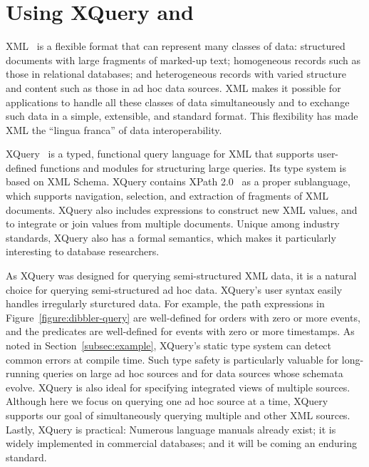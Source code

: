 \section{Using XQuery and \Galax{}}
\label{section:galax}

XML~\cite{xml} is a flexible format that can represent many classes of
data: structured documents with large fragments of marked-up text;
homogeneous records such as those in relational databases; and
heterogeneous records with varied structure and content such as those
in ad hoc data sources.  XML makes it possible for applications to
handle all these classes of data simultaneously and to exchange such
data in a simple, extensible, and standard format.  This flexibility
has made XML the ``lingua franca'' of data
interoperability. 

XQuery~\cite{xquery} is a typed, functional query language for XML
that supports user-defined functions and modules for structuring large
queries.  Its type system is based on XML Schema.  XQuery contains
XPath 2.0~\cite{xpath} as a proper sublanguage, which supports
navigation, selection, and extraction of fragments of XML documents.
XQuery also includes expressions to construct new XML values, and to
integrate or join values from multiple documents.  Unique among
industry standards, XQuery also has a formal semantics, which makes it
particularly interesting to database researchers. 

As XQuery was designed for querying semi-structured XML data, it is a
natural choice for querying semi-structured ad hoc data.  XQuery's
user syntax easily handles irregularly sturctured data.  For example,
the path expressions in Figure~\ref{figure:dibbler-query} are
well-defined for orders with zero or more events, and the predicates
are well-defined for events with zero or more timestamps.  As noted in
Section~\ref{subsec:example}, XQuery's static type system can detect
common errors at compile time.  Such type safety is particularly
valuable for long-running queries on large ad hoc sources and for data
sources whose schemata evolve.  XQuery is also ideal for specifying
integrated views of multiple sources.  Although here we focus on
querying one ad hoc source at a time, XQuery supports our goal of
simultaneously querying multiple \pads{} and other XML
sources. Lastly, XQuery is practical: Numerous language manuals
already exist; it is widely implemented in commercial databases; and
it will be coming an enduring standard.

